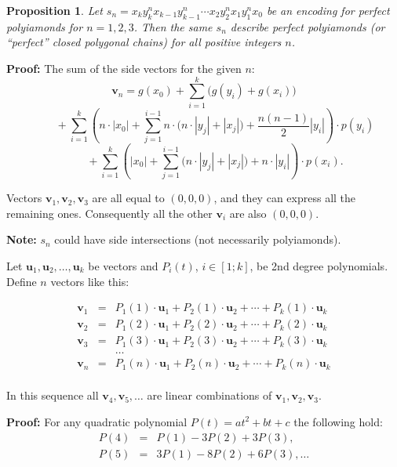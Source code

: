 \documentclass[a4paper,12pt]{article}
\newtheorem{proposition}{\bf Proposition}[section]
\begin{document}
\begin{proposition}
Let $s_n = x_k y_k^n x_{k-1} y_{k-1}^n \cdots x_2 y_2^n x_1 y_1^n x_0$ 
be an encoding for perfect polyiamonds for $n = 1,2,3$. 
Then the same $s_n$ describe perfect polyiamonds (or
``perfect'' closed polygonal chains) for all positive integers $n$.
\end{proposition}

\textbf{Proof:} The sum of the side vectors for the given $n$:
\[
\mathbf{v}_n = g(x_0) + \sum_{i=1}^k \bigl(g(y_i) + g(x_i)\bigr)
\]
\[
\qquad + \sum_{i=1}^k \left( n \cdot |x_0| + \sum_{j=1}^{i-1} n \cdot \bigl(n \cdot |y_j| + |x_j|\bigr) + \frac{n(n-1)}{2}|y_i| \right)\cdot p(y_i)
\]
\[
\qquad + \sum_{i=1}^k \left( |x_0| + \sum_{j=1}^{i-1} \bigl(n \cdot |y_j| + |x_j|\bigr) + n \cdot |y_i| \right)\cdot p(x_i).
\]

Vectors $\mathbf{v}_1, \mathbf{v}_2, \mathbf{v}_3$ 
are all equal to $(0,0,0)$, and they can express all the 
remaining ones. Consequently all the other $\mathbf{v}_i$ 
are also $(0,0,0)$.

\textbf{Note:} $s_n$ could have side intersections 
(not necessarily polyiamonds).


Let $\mathbf{u}_1, \mathbf{u}_2, \ldots, \mathbf{u}_k$ be vectors and $P_i(t)$, $i \in [1;k]$, 
be 2nd degree polynomials. Define $n$ vectors like this:

\[
\begin{array}{rcl}
\mathbf{v}_1 & = & P_1(1)\cdot \mathbf{u}_1 + P_2(1)\cdot \mathbf{u}_2 + \cdots + P_k(1)\cdot \mathbf{u}_k\\
\mathbf{v}_2 & = & P_1(2)\cdot \mathbf{u}_1 + P_2(2)\cdot \mathbf{u}_2 + \cdots + P_k(2)\cdot \mathbf{u}_k\\
\mathbf{v}_3 & = & P_1(3)\cdot \mathbf{u}_1 + P_2(3)\cdot \mathbf{u}_2 + \cdots + P_k(3)\cdot \mathbf{u}_k\\
& & \ldots\\
\mathbf{v}_n & = & P_1(n)\cdot \mathbf{u}_1 + P_2(n)\cdot \mathbf{u}_2 + \cdots + P_k(n)\cdot \mathbf{u}_k\\
\end{array}
\]

In this sequence all $\mathbf{v}_4, \mathbf{v}_5, \ldots$ are linear combinations of 
$\mathbf{v}_1, \mathbf{v}_2, \mathbf{v}_3$.

\textbf{Proof:} For any quadratic polynomial $P(t) = at^2 + bt + c$ the following hold:
\[
\begin{array}{rcl}
P(4) & = & P(1) - 3P(2) + 3P(3), \\
P(5) & = & 3P(1) - 8P(2) + 6P(3), \ldots
\end{array}
\]
\end{document}
